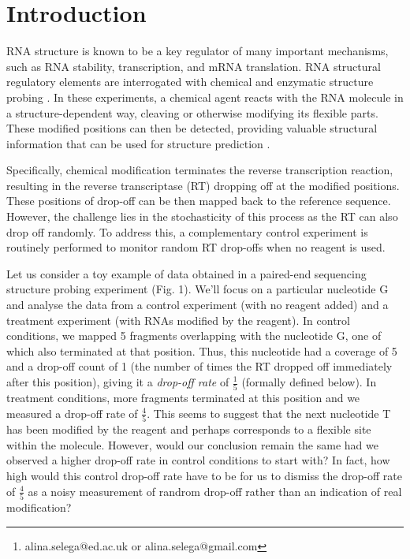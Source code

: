 \documentclass{article}\usepackage[]{graphicx}\usepackage[usenames,dvipsnames]{color}
\author{Alina Selega\footnote{alina.selega@ed.ac.uk or alina.selega@gmail.com}}
\date{Modified: October 25, 2016. Compiled: \today}
\begin{document}
\maketitle

\tableofcontents

\section{Introduction}

RNA structure is known to be a key regulator of many important mechanisms, such
as RNA stability, transcription, and mRNA translation. RNA structural regulatory
elements are interrogated with chemical and enzymatic structure probing
\cite{kubota2015progress}. In these experiments, a chemical agent reacts with
the RNA molecule in a structure-dependent way, cleaving or otherwise modifying
its flexible parts. These modified positions can then be detected, providing
valuable structural information that can be used for structure prediction
\cite{wu2015improved}.

Specifically, chemical modification terminates the reverse transcription
reaction, resulting in the reverse transcriptase (RT) dropping off at the
modified positions. These positions of drop-off can be then mapped back to the
reference sequence. However, the challenge lies in the stochasticity of this
process as the RT can also drop off randomly. To address this, a complementary
control experiment is routinely performed to monitor random RT drop-offs when no
reagent is used.

Let us consider a toy example of data obtained in a paired-end sequencing
structure probing experiment (Fig. 1). We'll focus on a particular nucleotide G
and analyse the data from a control experiment (with no reagent added) and a
treatment experiment (with RNAs modified by the reagent). In control conditions,
we mapped 5 fragments overlapping with the nucleotide G, one of which also
terminated at that position. Thus, this nucleotide had a coverage of 5 and a
drop-off count of 1 (the number of times the RT dropped off immediately after
this position), giving it a \textit{drop-off rate} of \( \frac{1}{5} \)
(formally defined below). In treatment conditions, more fragments terminated at
this position and we measured a drop-off rate of \( \frac{4}{5} \). This seems
to suggest that the next nucleotide T has been modified by the reagent and
perhaps corresponds to a flexible site within the molecule. However, would our
conclusion remain the same had we observed a higher drop-off rate in control
conditions to start with? In fact, how high would this control drop-off rate
have to be for us to dismiss the drop-off rate of \( \frac{4}{5} \) as a noisy
measurement of randrom drop-off rather than an indication of real modification?
\end{document}
